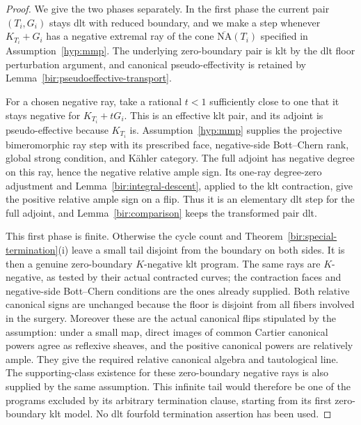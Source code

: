 \documentclass[11pt,letterpaper]{article}
\newcommand{\NA}{\overline{\mathrm{NA}}}
\theoremstyle{definition}
\theoremstyle{remark}
\begin{document}
\begin{proof}
We give the two phases separately.  In the first phase the current
pair $(T_i,G_i)$ stays dlt with reduced boundary, and we make a step
whenever $K_{T_i}+G_i$ has a negative extremal ray of the cone
$\NA(T_i)$ specified in Assumption~\ref{hyp:mmp}.
The underlying zero-boundary pair is klt by the dlt floor
perturbation argument, and canonical pseudo-effectivity is retained
by Lemma~\ref{bir:pseudoeffective-transport}.

For a chosen negative ray, take a rational $t<1$ sufficiently close
to one that it stays negative for $K_{T_i}+tG_i$.  This is an
effective klt pair, and its adjoint is pseudo-effective because
$K_{T_i}$ is.  Assumption~\ref{hyp:mmp} supplies the projective
bimeromorphic ray step with its prescribed face, negative-side
Bott--Chern rank, global strong condition, and K\"ahler category.
The full adjoint has negative degree on this ray, hence the negative
relative ample sign.  Its one-ray degree-zero adjustment and
Lemma~\ref{bir:integral-descent}, applied to the klt contraction,
give the positive relative ample sign on a flip.  Thus it is an
elementary dlt step for the full adjoint, and
Lemma~\ref{bir:comparison} keeps the transformed pair dlt.

This first phase is finite.  Otherwise the cycle count and
Theorem~\ref{bir:special-termination}(i) leave a small tail disjoint
from the boundary on both sides.  It is then a genuine
zero-boundary $K$-negative klt program.  The same rays are
$K$-negative, as tested by their actual contracted curves; the
contraction faces and negative-side Bott--Chern conditions are the
ones already supplied.  Both relative canonical signs are unchanged
because the floor is disjoint from all fibers involved in the
surgery.  Moreover these are the actual canonical flips stipulated
by the assumption: under a small map, direct images of common
Cartier canonical powers agree as reflexive sheaves, and the
positive canonical powers are relatively ample.  They give the
required relative canonical algebra and tautological line.  The
supporting-class existence for these zero-boundary negative rays
is also supplied by the same assumption.  This infinite tail would
therefore be one of the programs excluded by its arbitrary
termination clause, starting from its first zero-boundary klt
model.  No dlt fourfold termination assertion has been used.


\end{proof}
\end{document}
